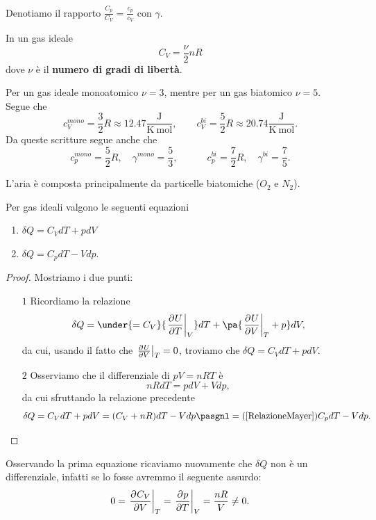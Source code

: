 \begin{notation}
Denotiamo il rapporto $\frac{C_p}{C_V}=\frac{c_p}{c_V}$ con $\gamma$.
\end{notation}



\begin{fact}
In un gas ideale
\[C_V=\frac\nu2nR\]
dove $\nu$ \`e il \textbf{numero di gradi di libert\`a}.
\end{fact}
\begin{remark}
Per un gas ideale monoatomico $\nu=3$, mentre per un gas biatomico $\nu=5$.\\
Segue che
\[c_V^{mono}=\frac32R\approx 12.47\frac{\mathrm{J}}{\mathrm{K\ mol}},\qquad c_V^{bi}=\frac52R\approx 20.74\frac{\mathrm{J}}{\mathrm{K\ mol}}.\]
Da queste scritture segue anche che
\[c_p^{mono}=\frac52R,\quad \gamma^{mono}=\frac53,\quad\qquad c_p^{bi}=\frac72R,\quad \gamma^{bi}=\frac75.\]
\end{remark}

\begin{remark}
L'aria \`e composta principalmente da particelle biatomiche ($O_2$ e $N_2$).
\end{remark}

\begin{proposition}\label{CaloreInfinitesimaleConCapacita}
Per gas ideali valgono le seguenti equazioni
\begin{enumerate}
\item $\delta Q=C_VdT+pdV$
\item $\delta Q=C_p dT-Vdp$.
\end{enumerate}
\end{proposition}
\begin{proof}
Mostriamo i due punti:
\setlength{\leftmargini}{0cm}
\begin{itemize}
\item[$\boxed{1}$] Ricordiamo la relazione \[\delta Q=\under{=C_V}{\ppb TUV} dT+\pa{{\ppb VUT}+p}dV,\]
da cui, usando il fatto che $\ppb VUT=0$, troviamo che $\delta Q=C_V dT+pdV$.
\item[$\boxed{2}$] Osserviamo che il differenziale di $pV=nRT$ \`e
\[nRdT=pdV+Vdp,\]
da cui sfruttando la relazione precedente
\[\delta Q=C_VdT+pdV=({C_V+nR})dT-Vdp\pasgnl={(\ref{RelazioneMayer})}C_p dT-Vdp.\]
\end{itemize}
\setlength{\leftmargini}{0.5cm}
\end{proof}
\begin{remark}
Osservando la prima equazione ricaviamo nuovamente che $\delta Q$ non \`e un differenziale, infatti se lo fosse avremmo il seguente assurdo:
\[0=\ppb V{C_V}T=\ppb TpV=\frac{nR}V\neq 0.\]
\end{remark}


